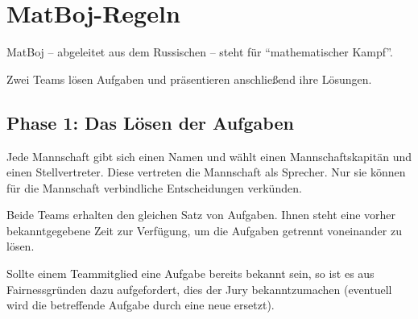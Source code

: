 \section*{MatBoj-Regeln} 

MatBoj -- abgeleitet aus dem Russischen -- steht für \enquote{mathematischer Kampf}.

Zwei Teams lösen Aufgaben und präsentieren anschließend ihre Lösungen.

\subsection*{Phase 1: Das Lösen der Aufgaben}
Jede Mannschaft gibt sich einen Namen und wählt einen Mannschaftskapitän und einen Stellvertreter. Diese vertreten die Mannschaft als Sprecher. Nur sie können für die Mannschaft verbindliche Entscheidungen verkünden.

Beide Teams erhalten den gleichen Satz von Aufgaben. Ihnen steht eine vorher bekanntgegebene Zeit zur Verfügung, um die Aufgaben getrennt voneinander zu lösen. 

Sollte einem Teammitglied eine Aufgabe bereits bekannt sein, so ist es aus Fairnessgründen dazu aufgefordert, dies der Jury bekanntzumachen (eventuell wird die betreffende Aufgabe durch eine neue ersetzt).


